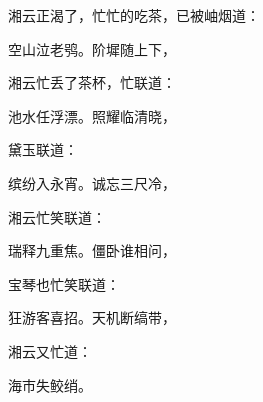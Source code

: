 \begin{parag}
    湘云正渴了，忙忙的吃茶，已被岫烟道：
\end{parag}


\begin{poem}
    \begin{pl} 空山泣老鸮。阶墀随上下，\end{pl}
\end{poem}


\begin{parag}
    湘云忙丢了茶杯，忙联道：
\end{parag}


\begin{poem}
    \begin{pl} 池水任浮漂。照耀临清晓，\end{pl}
\end{poem}


\begin{parag}
    黛玉联道：
\end{parag}


\begin{poem}
    \begin{pl} 缤纷入永宵。诚忘三尺冷，\end{pl}
\end{poem}


\begin{parag}
    湘云忙笑联道：
\end{parag}


\begin{poem}
    \begin{pl} 瑞释九重焦。僵卧谁相问，\end{pl}
\end{poem}


\begin{parag}
    宝琴也忙笑联道：
\end{parag}


\begin{poem}
    \begin{pl} 狂游客喜招。天机断缟带，\end{pl}
\end{poem}


\begin{parag}
    湘云又忙道：
\end{parag}


\begin{poem}
    \begin{pl} 海市失鲛绡。\end{pl}
\end{poem}


